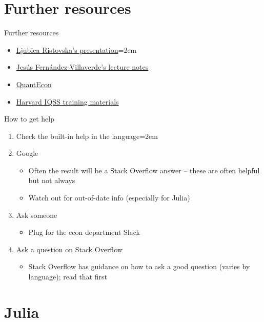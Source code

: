 \documentclass[handout]{beamer}
\begin{document}
\section{Further resources}
\begin{frame}{Further resources}
\begin{itemize}
    \item \href{https://scholar.harvard.edu/ristovska/resources}{Ljubica Ristovska's presentation}\itemsep=2em
    \item \href{https://www.sas.upenn.edu/~jesusfv/teaching.html}{Jesús Fernández-Villaverde's lecture notes}
    \item \href{https://quantecon.org/}{QuantEcon}
    \item \href{https://www.iq.harvard.edu/data-science-services/workshop-materials}{Harvard IQSS training materials}
\end{itemize}
\end{frame}

\begin{frame}{How to get help}

\begin{enumerate}
    \item Check the built-in help in the language\itemsep=2em
    \item Google
    \begin{itemize}
        \item Often the result will be a Stack Overflow answer -- these are often helpful but not always
        \item Watch out for out-of-date info (especially for Julia)
    \end{itemize}
    \item Ask someone
    \begin{itemize}
        \item Plug for the econ department Slack
    \end{itemize}
    \item Ask a question on Stack Overflow
    \begin{itemize}
        \item Stack Overflow has guidance on how to ask a good question (varies by language); read that first
    \end{itemize}
\end{enumerate}
\end{frame}

\section{Julia}
\end{document}
